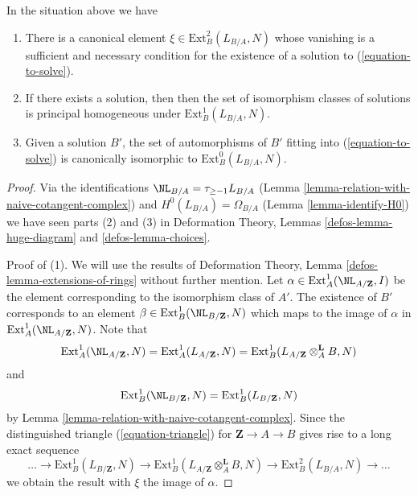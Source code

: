 \begin{lemma}
\label{lemma-find-obstruction}
In the situation above we have
\begin{enumerate}
\item There is a canonical element $\xi \in \text{Ext}^2_B(L_{B/A}, N)$
whose vanishing is a sufficient and necessary condition for the existence
of a solution to (\ref{equation-to-solve}).
\item If there exists a solution, then then the set of
isomorphism classes of solutions is principal homogeneous under
$\text{Ext}^1_B(L_{B/A}, N)$.
\item Given a solution $B'$, the set of automorphisms of $B'$
fitting into (\ref{equation-to-solve}) is canonically isomorphic
to $\text{Ext}^0_B(L_{B/A}, N)$.
\end{enumerate}
\end{lemma}

\begin{proof}
Via the identifications $\NL_{B/A} = \tau_{\geq -1}L_{B/A}$
(Lemma \ref{lemma-relation-with-naive-cotangent-complex}) and
$H^0(L_{B/A}) = \Omega_{B/A}$
(Lemma \ref{lemma-identify-H0})
we have seen parts (2) and (3) in
Deformation Theory, Lemmas \ref{defos-lemma-huge-diagram} and
\ref{defos-lemma-choices}.

\medskip\noindent
Proof of (1). We will use the results of
Deformation Theory, Lemma \ref{defos-lemma-extensions-of-rings}
without further mention.
Let $\alpha \in \text{Ext}^1_A(\NL_{A/\mathbf{Z}}, I)$
be the element corresponding to the isomorphism class of $A'$.
The existence of $B'$ corresponds to an element
$\beta \in \text{Ext}_B^1(\NL_{B/\mathbf{Z}}, N)$
which maps to the image of $\alpha$ in
$\text{Ext}^1_A(\NL_{A/\mathbf{Z}}, N)$. Note that
$$
\text{Ext}^1_A(\NL_{A/\mathbf{Z}}, N) =
\text{Ext}^1_A(L_{A/\mathbf{Z}}, N) =
\text{Ext}^1_B(L_{A/\mathbf{Z}} \otimes_A^\mathbf{L} B, N)
$$
and
$$
\text{Ext}^1_B(\NL_{B/\mathbf{Z}}, N) =
\text{Ext}^1_B(L_{B/\mathbf{Z}}, N)
$$
by Lemma \ref{lemma-relation-with-naive-cotangent-complex}.
Since the distinguished triangle (\ref{equation-triangle})
for $\mathbf{Z} \to A \to B$ gives rise to a long exact sequence
$$
\ldots \to
\text{Ext}^1_B(L_{B/\mathbf{Z}}, N) \to
\text{Ext}^1_B(L_{A/\mathbf{Z}} \otimes_A^\mathbf{L} B, N) \to
\text{Ext}^2_B(L_{B/A}, N) \to \ldots
$$
we obtain the result with $\xi$ the image of $\alpha$.
\end{proof}







